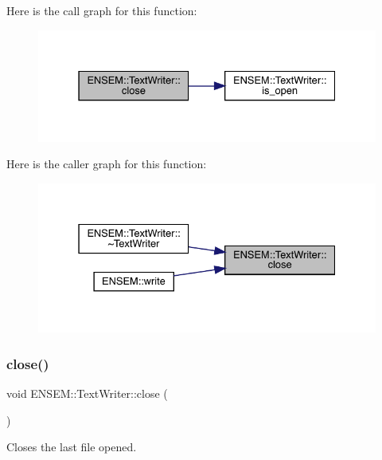 Here is the call graph for this function\+:
\nopagebreak
\begin{figure}[H]
\begin{center}
\leavevmode
\includegraphics[width=331pt]{db/d53/classENSEM_1_1TextWriter_a8b65ccb4936fe8b05492e4f30983b7ee_cgraph}
\end{center}
\end{figure}
Here is the caller graph for this function\+:
\nopagebreak
\begin{figure}[H]
\begin{center}
\leavevmode
\includegraphics[width=331pt]{db/d53/classENSEM_1_1TextWriter_a8b65ccb4936fe8b05492e4f30983b7ee_icgraph}
\end{center}
\end{figure}
\mbox{\label{classENSEM_1_1TextWriter_a8b65ccb4936fe8b05492e4f30983b7ee}} 
\subsubsection{\texorpdfstring{close()}{close()}\hspace{0.1cm}{\footnotesize\ttfamily [2/3]}}
{\footnotesize\ttfamily void E\+N\+S\+E\+M\+::\+Text\+Writer\+::close (\begin{DoxyParamCaption}{ }\end{DoxyParamCaption})}



Closes the last file opened. 

